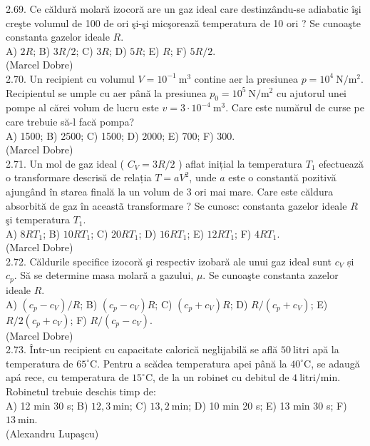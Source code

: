 2.69. Ce căldură molară izocoră are un gaz ideal care destinzându-se adiabatic îşi creşte volumul de 100 de ori şi-şi micşorează temperatura de 10 ori ? Se cunoaşte constanta gazelor ideale $R$.\\ A) $2 R$; B) $3 R / 2$; C) $3 R$; D) $5 R$; E) $R$; F) $5 R / 2$.\\ (Marcel Dobre)\\

2.70. Un recipient cu volumul $V=10^{-1} \mathrm{~m}^{3}$ contine aer la presiunea $p=10^{4} \mathrm{~N} / \mathrm{m}^{2}$. Recipientul se umple cu aer până la presiunea $p_{0}=10^{5} \mathrm{~N} / \mathrm{m}^{2}$ cu ajutorul unei pompe al cărei volum de lucru este $v=3 \cdot 10^{-4} \mathrm{~m}^{3}$. Care este numărul de curse pe care trebuie să-l facă pompa?\\ A) 1500; B) 2500; C) 1500; D) 2000; E) 700; F) 300.\\ (Marcel Dobre)\\

2.71. Un mol de gaz ideal ( $C_{V}=3 R / 2$ ) aflat inițial la temperatura $T_{1}$ efectuează o transformare descrisă de relația $T=a V^{2}$, unde $a$ este o constantă pozitivă ajungând în starea finală la un volum de 3 ori mai mare. Care este căldura absorbită de gaz în aceastã transformare ? Se cunosc: constanta gazelor ideale $R$ şi temperatura $T_{1}$.\\ A) $8 R T_{1}$; B) $10 R T_{1}$; C) $20 R T_{1}$; D) $16 R T_{1}$; E) $12 R T_{1}$; F) $4 R T_{1}$.\\ (Marcel Dobre)\\

2.72. Căldurile specifice izocoră şi respectiv izobară ale unui gaz ideal sunt $c_{V}$ și $c_{p}$. Să se determine masa molară a gazului, $\mu$. Se cunoaşte constanta zazelor ideale $R$.\\ A) $\left(c_{p}-c_{V}\right) / R$; B) $\left(c_{p}-c_{V}\right) R$; C) $\left(c_{p}+c_{V}\right) R$; D) $R /\left(c_{p}+c_{V}\right)$; E) $R / 2\left(c_{p}+c_{V}\right)$; F) $R /\left(c_{p}-c_{V}\right)$.\\ (Marcel Dobre)\\

2.73. Într-un recipient cu capacitate calorică neglijabilă se află $50 \mathrm{~litri}$ apă la temperatura de $65^{\circ} \mathrm{C}$. Pentru a scădea temperatura apei până la $40^{\circ} \mathrm{C}$, se adaugă apá rece, cu temperatura de $15^{\circ} \mathrm{C}$, de la un robinet cu debitul de $4 \mathrm{~litri} / \mathrm{min}$. Robinetul trebuie deschis timp de:\\ A) 12 min 30 s; B) $12,3 \mathrm{~min}$; C) $13,2 \mathrm{~min}$; D) 10 min 20 s; E) 13 min 30 s; F) $13 \mathrm{~min}$.\\ (Alexandru Lupaşcu)\\

